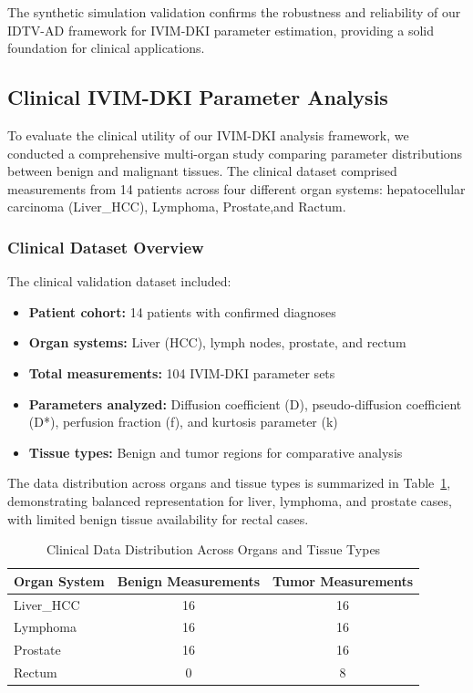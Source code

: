 \documentclass[a4paper,12pt]{article}
\begin{document}
The synthetic simulation validation confirms the robustness and reliability of our IDTV-AD framework for IVIM-DKI parameter estimation, providing a solid foundation for clinical applications.
\subsection{Clinical IVIM-DKI Parameter Analysis}

To evaluate the clinical utility of our IVIM-DKI analysis framework, we conducted a comprehensive multi-organ study comparing parameter distributions between benign and malignant tissues. The clinical dataset comprised measurements from 14 patients across four different organ systems: hepatocellular carcinoma (Liver\_HCC), Lymphoma, Prostate,and Ractum.

\subsubsection{Clinical Dataset Overview}

The clinical validation dataset included:
\begin{itemize}
    \item \textbf{Patient cohort:} 14 patients with confirmed diagnoses
    \item \textbf{Organ systems:} Liver (HCC), lymph nodes, prostate, and rectum
    \item \textbf{Total measurements:} 104 IVIM-DKI parameter sets
    \item \textbf{Parameters analyzed:} Diffusion coefficient (D), pseudo-diffusion coefficient (D*), perfusion fraction (f), and kurtosis parameter (k)
    \item \textbf{Tissue types:} Benign and tumor regions for comparative analysis
\end{itemize}

The data distribution across organs and tissue types is summarized in Table~\ref{tab:clinical_data_distribution}, demonstrating balanced representation for liver, lymphoma, and prostate cases, with limited benign tissue availability for rectal cases.

\begin{table}[H]
\centering
\caption{Clinical Data Distribution Across Organs and Tissue Types}
\begin{tabular}{@{}lcc@{}}
\toprule
Organ System & Benign Measurements & Tumor Measurements \\
\midrule
Liver\_HCC & 16 & 16 \\
Lymphoma & 16 & 16 \\
Prostate & 16 & 16 \\
Rectum & 0 & 8 \\
\bottomrule
\end{tabular}
\label{tab:clinical_data_distribution}
\end{table}
\end{document}
